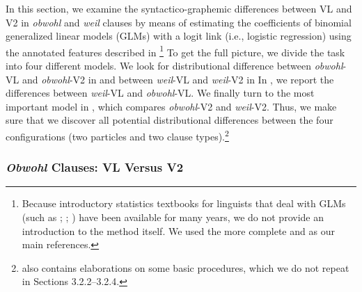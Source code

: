 In this section, we examine the syntactico-graphemic differences between VL and V2 in \textit{obwohl} and \textit{weil} clauses by means of estimating the coefficients of binomial generalized linear models (GLMs) with a logit link (i.e., logistic regression) using the annotated features described in \footnote{Because introductory statistics textbooks for linguists that deal with GLMs (such as \citealt{Baayen2008}; \citealt{Johnson2008}; \citealt{Gries2013}) have been available for many years, we do not provide an introduction to the method itself. We used the more complete \citet{FahrmeirEtAl2013} and \citet{ZuurEtAl2009} as our main references.} To get the full picture, we divide the task into four different models. We look for distributional difference between \textit{obwohl}{}-VL and \textit{obwohl}{}-V2 in  and between \textit{weil}{}-VL and \textit{weil}{}-V2 in  In , we report the differences between \textit{weil}{}-VL and \textit{obwohl}{}-VL. We finally turn to the most important model in , which compares \textit{obwohl}{}-V2 and \textit{weil}{}-V2. Thus, we make sure that we discover all potential distributional differences between the four configurations (two particles and two clause types).\footnote{ also contains elaborations on some basic procedures, which we do not repeat in Sections 3.2.2–3.2.4.}



\subsubsection{\textit{Obwohl} Clauses: VL Versus V2}



